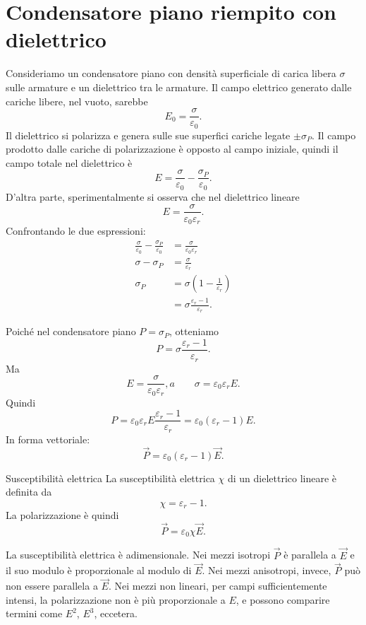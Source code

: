 \documentclass[a4paper]{article}
\begin{document}
\section{Condensatore piano riempito con dielettrico}

Consideriamo un condensatore piano con densità superficiale di carica libera \(\sigma\) sulle armature e un dielettrico tra le armature. Il campo elettrico generato dalle cariche libere, nel vuoto, sarebbe
\[
    E_0=\frac{\sigma}{\varepsilon_0}.
\]
Il dielettrico si polarizza e genera sulle sue superfici cariche legate \(\pm\sigma_P\). Il campo prodotto dalle cariche di polarizzazione è opposto al campo iniziale, quindi il campo totale nel dielettrico è
\[
    E=\frac{\sigma}{\varepsilon_0}-\frac{\sigma_P}{\varepsilon_0}.
\]
D'altra parte, sperimentalmente si osserva che nel dielettrico lineare
\[
    E=\frac{\sigma}{\varepsilon_0\varepsilon_r}.
\]
Confrontando le due espressioni:
\begin{align*}
    \frac{\sigma}{\varepsilon_0}-\frac{\sigma_P}{\varepsilon_0}
    &=\frac{\sigma}{\varepsilon_0\varepsilon_r} \\
    \sigma-\sigma_P
    &=\frac{\sigma}{\varepsilon_r} \\
    \sigma_P
    &=\sigma\left(1-\frac{1}{\varepsilon_r}\right) \\
    &=\sigma\frac{\varepsilon_r-1}{\varepsilon_r}.
\end{align*}

Poiché nel condensatore piano \(P=\sigma_P\), otteniamo
\[
    P=\sigma\frac{\varepsilon_r-1}{\varepsilon_r}.
\]
Ma
\[
    E=\frac{\sigma}{\varepsilon_0\varepsilon_r},
    a\qquad
    \sigma=\varepsilon_0\varepsilon_r E.
\]
Quindi
\[
    P=\varepsilon_0\varepsilon_r E\frac{\varepsilon_r-1}{\varepsilon_r}
    =\varepsilon_0(\varepsilon_r-1)E.
\]
In forma vettoriale:
\[
    \vec{P}=\varepsilon_0(\varepsilon_r-1)\vec{E}.
\]

\begin{snippetdefinition}{Susceptibilità elettrica}
    La susceptibilità elettrica \(\chi\) di un dielettrico lineare è definita da
    \[
        \chi=\varepsilon_r-1.
    \]
    La polarizzazione è quindi
    \[
        \vec{P}=\varepsilon_0\chi\vec{E}.
    \]
\end{snippetdefinition}

La susceptibilità elettrica è adimensionale. Nei mezzi isotropi \(\vec{P}\) è parallela a \(\vec{E}\) e il suo modulo è proporzionale al modulo di \(\vec{E}\). Nei mezzi anisotropi, invece, \(\vec{P}\) può non essere parallela a \(\vec{E}\). Nei mezzi non lineari, per campi sufficientemente intensi, la polarizzazione non è più proporzionale a \(E\), e possono comparire termini come \(E^2\), \(E^3\), eccetera.
\end{document}
